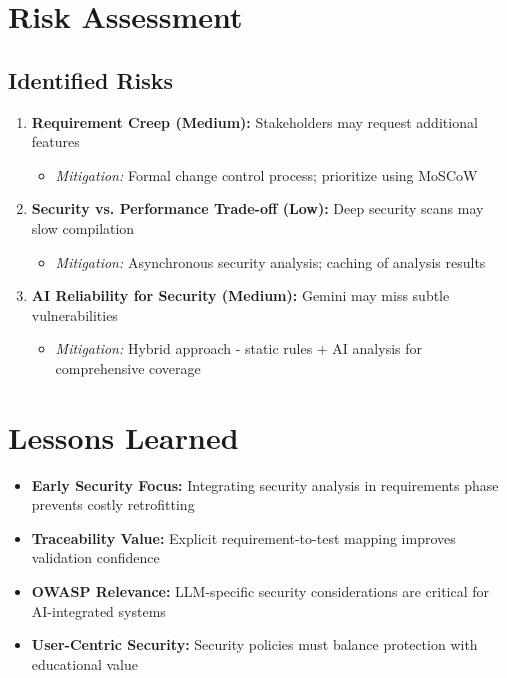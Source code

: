 \documentclass[a4paper,11pt]{article}
\begin{document}
\section{Risk Assessment}

\subsection{Identified Risks}

\begin{enumerate}
    \item \textbf{Requirement Creep (Medium):} Stakeholders may request additional features
    \begin{itemize}
        \item \textit{Mitigation:} Formal change control process; prioritize using MoSCoW
    \end{itemize}
    
    \item \textbf{Security vs. Performance Trade-off (Low):} Deep security scans may slow compilation
    \begin{itemize}
        \item \textit{Mitigation:} Asynchronous security analysis; caching of analysis results
    \end{itemize}
    
    \item \textbf{AI Reliability for Security (Medium):} Gemini may miss subtle vulnerabilities
    \begin{itemize}
        \item \textit{Mitigation:} Hybrid approach - static rules + AI analysis for comprehensive coverage
    \end{itemize}
\end{enumerate}

\section{Lessons Learned}

\begin{itemize}[leftmargin=*]
    \item \textbf{Early Security Focus:} Integrating security analysis in requirements phase prevents costly retrofitting
    \item \textbf{Traceability Value:} Explicit requirement-to-test mapping improves validation confidence
    \item \textbf{OWASP Relevance:} LLM-specific security considerations are critical for AI-integrated systems
    \item \textbf{User-Centric Security:} Security policies must balance protection with educational value
\end{itemize}
\end{document}
